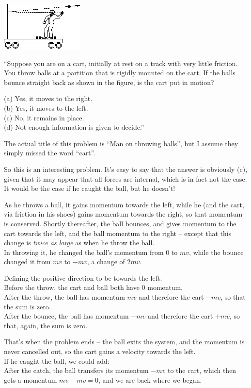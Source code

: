 \documentclass[8.01x]{subfiles}
\begin{document}
\begin{center}
\includegraphics[scale=0.8]{Graphics/h6p8}
\end{center}

``Suppose you are on a cart, initially at rest on a track with very little friction. You throw balls at a partition that is rigidly mounted on the cart. If the balls bounce straight back as shown in the figure, is the cart put in motion?

(a) Yes, it moves to the right.\\
(b) Yes, it moves to the left.\\
(c) No, it remains in place.\\
(d) Not enough information is given to decide.''

The actual title of this problem is ``Man on throwing balls'', but I assume they simply missed the word ``cart''.

So this is an interesting problem. It's easy to say that the answer is obviously (c), given that it may appear that all forces are internal, which is in fact not the case. It would be the case if he caught the ball, but he doesn't!

As he throws a ball, it gains momentum towards the left, while he (and the cart, via friction in his shoes) gains momentum towards the right, so that momentum is conserved. Shortly thereafter, the ball bounces, and gives momentum to the cart towards the left, and the ball momentum to the right -- except that this change is \emph{twice as large} as when he throw the ball.\\
In throwing it, he changed the ball's momentum from $0$ to $m v$, while the bounce changed it from $m v$ to $-m v$, a change of $2 m v$. 

Defining the positive direction to be towards the left:\\
Before the throw, the cart and ball both have 0 momentum.\\
After the throw, the ball has momentum $m v$ and therefore the cart $- m v$, so that the sum is zero.\\
After the bounce, the ball has momentum $- m v$ and therefore the cart $+ m v$, so that, again, the sum is zero.

That's when the problem ends -- the ball exits the system, and the momentum is never cancelled out, so the cart gains a velocity towards the left.\\
If he caught the ball, we could add:\\
After the catch, the ball transfers its momentum $- m v$ to the cart, which then gets a momentum $m v - m v = 0$, and we are back where we began.
\end{document}
